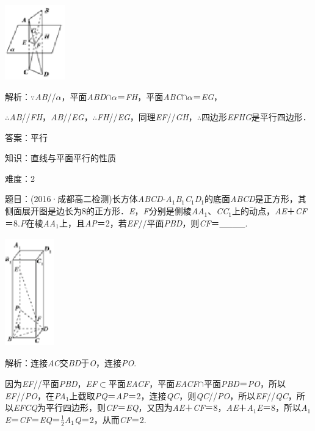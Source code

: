 \documentclass{article} %
\begin{document}
\includegraphics*[width=1.02in, height=1.27in, keepaspectratio=false]{image168}

解析：$\mathrm{\because}$\textit{AB}//\textit{$\alpha$}，平面\textit{ABD}$\mathrm{\cap}$\textit{$\alpha$}＝\textit{FH}，平面\textit{ABC}$\mathrm{\cap}$\textit{$\alpha$}＝\textit{EG}，

$\mathrm{\therefore}$\textit{AB}//\textit{FH}，\textit{AB}//\textit{EG}，$\mathrm{\therefore}$\textit{FH}//\textit{EG}，同理\textit{EF}//\textit{GH}，$\mathrm{\therefore}$四边形\textit{EFHG}是平行四边形．

答案：平行

知识：直线与平面平行的性质

难度：2

题目：(2016·成都高二检测)长方体\textit{ABCD}-\textit{A}${}_{1}$\textit{B}${}_{1}$\textit{C}${}_{1}$\textit{D}${}_{1}$的底面\textit{ABCD}是正方形，其侧面展开图是边长为8的正方形．\textit{E}，\textit{F}分别是侧棱\textit{AA}${}_{1}$、\textit{CC}${}_{1}$上的动点，\textit{AE}＋\textit{CF}＝8.\textit{P}在棱\textit{AA}${}_{1}$上，且\textit{AP}＝2，若\textit{EF}//平面\textit{PBD}，则\textit{CF}＝\_\_\_\_.

\includegraphics*[width=0.83in, height=1.85in, keepaspectratio=false]{image169}

解析：连接\textit{AC}交\textit{BD}于\textit{O}，连接\textit{PO}.

因为\textit{EF}//平面\textit{PBD}，\textit{EF}$\mathrm{\subset }$平面\textit{EACF}，平面\textit{EACF}$\mathrm{\cap}$平面\textit{PBD}＝\textit{PO}，所以\textit{EF}//\textit{PO}，在\textit{PA}${}_{1}$上截取\textit{PQ}＝\textit{AP}＝2，连接\textit{QC}，则\textit{QC}//\textit{PO}，所以\textit{EF}//\textit{QC}，所以\textit{EFCQ}为平行四边形，则\textit{CF}＝\textit{EQ}，又因为\textit{AE}＋\textit{CF}＝8，\textit{AE}＋\textit{A}${}_{1}$\textit{E}＝8，所以\textit{A}${}_{1}$\textit{E}＝\textit{CF}＝\textit{EQ}＝$\frac{1}{2}$\textit{A}${}_{1}$\textit{Q}＝2，从而\textit{CF}＝2.
\end{document}
